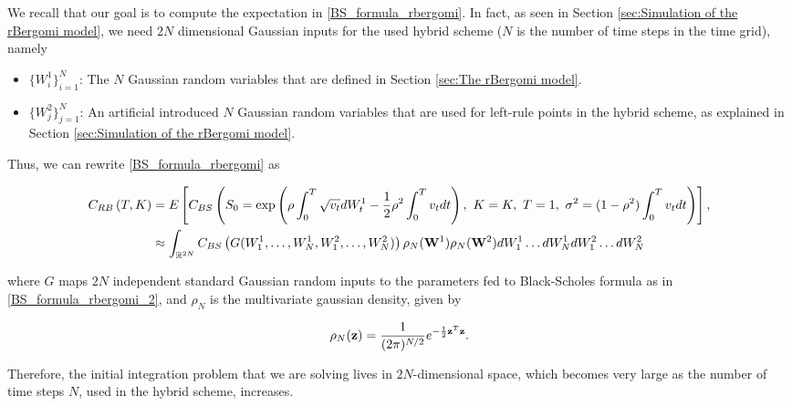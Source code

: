 We recall that our goal is to compute the expectation in \eqref{BS_formula_rbergomi}. In fact, as seen in Section \ref{sec:Simulation of the rBergomi model}, we need   $2N$ dimensional Gaussian inputs for the used  hybrid  scheme ($N$ is the number of time steps in  the time grid), namely
\begin{itemize}
	\item $\{W^1_i\}_{i=1}^N$: The $N$ Gaussian random variables that are defined in Section  \ref{sec:The rBergomi model}.
	\item $\{W^2_j\}_{j=1}^N$: An artificial introduced $N$ Gaussian random variables that are used for left-rule points in the hybrid scheme, as explained in Section  \ref{sec:Simulation of the rBergomi model}.
\end{itemize}

Thus, we can rewrite \eqref{BS_formula_rbergomi} as 


\begin{align}\label{BS_formula_rbergomi_2}
C_{RB}\left( T, K \right)&=E\left[C_{BS}\left( S_0 = \operatorname{exp}\left(\rho \int_0^T \sqrt{v_t} dW_t^1 - \frac{1}{2}
\rho^2 \int_0^T v_t dt\right),\ K = K, \ T = 1, \ \sigma^2 = (1-\rho^2)
\int_0^T v_t dt \right) \right], \nonumber \\
&\approx \int_{\mathbb{R}^{2N}} C_{BS} \left(G(W^1_1,\dots,W^1_N,W^2_1,\dots,W^2_N)\right) \rho_{N}(\mathbf{W}^1)  \rho_{N}(\mathbf{W}^2) dW_1^1 \dots dW_N^1  dW_1^2 \dots dW_N^2
\end{align}

where $G$  maps  $2N$ independent standard Gaussian random inputs to the parameters fed to Black-Scholes formula as in \eqref{BS_formula_rbergomi_2}, and  $\rho_N$ is the multivariate gaussian density, given by 

\begin{equation*}\label{eq: multivariate gaussian distribution}
\rho_N(\mathbf{z})=\frac{1}{(2 \pi)^{N/2}} e^{-\frac{1}{2} \mathbf{z}^T \mathbf{z}} .
\end{equation*} 

Therefore, the initial integration problem that we are solving lives in $2 N$-dimensional space, which becomes very large as the number of time steps $N$, used in the hybrid scheme, increases.


